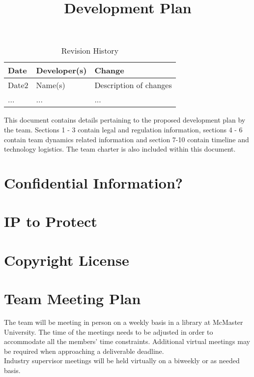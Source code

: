 \documentclass{article}
\title{Development Plan\\\progname}
\author{\authname}
\date{}
\begin{document}
\maketitle

\begin{table}[hp]
\caption{Revision History} \label{TblRevisionHistory}
\begin{tabularx}{\textwidth}{llX}
\toprule
\textbf{Date} & \textbf{Developer(s)} & \textbf{Change}\\
\midrule
Date2 & Name(s) & Description of changes\\
... & ... & ...\\
\bottomrule
\end{tabularx}
\end{table}

\newpage{}


This document contains details pertaining to the proposed development plan by the team.
Sections 1 - 3 contain legal and regulation information, sections 4 - 6 contain team dynamics related information and 
section 7-10 contain timeline and technology logistics. The team charter is also included within this document. \\


\section{Confidential Information?}

\section{IP to Protect}


\section{Copyright License}



\section{Team Meeting Plan}

The team will be meeting in person on a weekly basis in a library at McMaster University. The time of the meetings
needs to be adjusted in order to accommodate all the members' time constraints.
Additional virtual meetings may be required when approaching a deliverable deadline.\\
Industry supervisor meetings will be held virtually on a biweekly or as needed basis. \\
\end{document}
